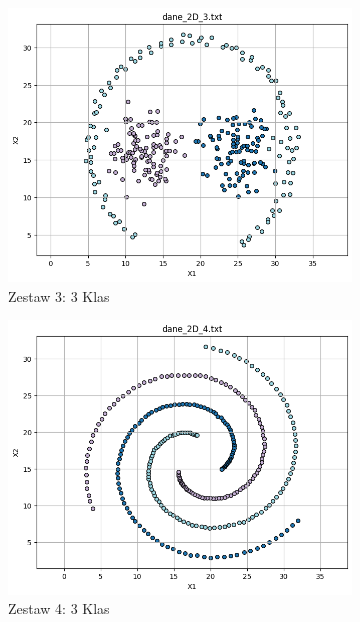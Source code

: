 \documentclass[polish,12pt,a4paper]{extarticle}
\begin{document}
\begin{figure}[h!]
    \hfill
    \begin{subfigure}[b]{0.30\textwidth}
        \includegraphics[width=\linewidth]{img/data/dane3.png}
        \captionsetup{labelformat=empty}
        \caption{Zestaw 3: 3 Klas}
    \end{subfigure}
    \hfill
    \begin{subfigure}[b]{0.30\textwidth}
        \includegraphics[width=\linewidth]{img/data/dane4.png}
        \captionsetup{labelformat=empty}
        \caption{Zestaw 4: 3 Klas}
    \end{subfigure}
    \hfill
    \begin{subfigure}[b]{0.30\textwidth}

\end{subfigure}
\end{figure}
\end{document}
